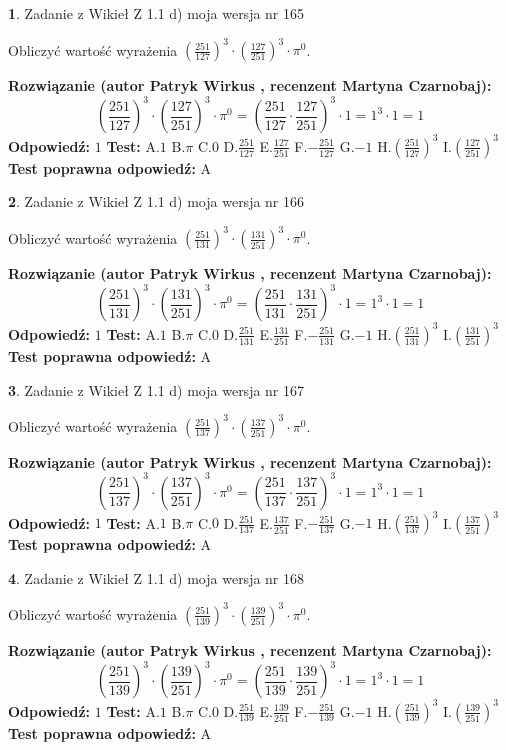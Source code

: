 \documentclass[12pt, a4paper]{article}
\theoremstyle{definition} %
\newtheorem{zad}{}
\newcommand{\zadStart}[1]{\begin{zad}#1\newline}
\newcommand{\zadStop}{\end{zad}}
\newcommand{\rozwStart}[2]{\noindent \textbf{Rozwiązanie (autor #1 , recenzent #2): }\newline}
\newcommand{\rozwStop}{\newline}
\newcommand{\odpStart}{\noindent \textbf{Odpowiedź:}\newline}
\newcommand{\odpStop}{\newline}
\newcommand{\testStart}{\noindent \textbf{Test:}\newline}
\newcommand{\testStop}{\newline}
\newcommand{\kluczStart}{\noindent \textbf{Test poprawna odpowiedź:}\newline}
\newcommand{\kluczStop}{\newline}
\begin{document}
\zadStart{Zadanie z Wikieł Z 1.1 d) moja wersja nr 165}

Obliczyć wartość wyrażenia $(\frac{251}{127})^{3} \cdot (\frac{127}{251})^{3} \cdot \pi^{0}$.
\zadStop
\rozwStart{Patryk Wirkus}{Martyna Czarnobaj}
$$(\frac{251}{127})^{3} \cdot (\frac{127}{251})^{3} \cdot \pi^{0} = (\frac{251}{127} \cdot \frac{127}{251})^{3} \cdot 1 = 1^{3} \cdot 1 = 1$$
\rozwStop
\odpStart
$1$
\odpStop
\testStart
A.$1$ B.$\pi$ C.$0$ D.$\frac{251}{127}$ E.$\frac{127}{251}$
F.$-\frac{251}{127}$ G.$-1$
H.$(\frac{251}{127})^{3}$
I.$(\frac{127}{251})^{3}$
\testStop
\kluczStart
A
\kluczStop



\zadStart{Zadanie z Wikieł Z 1.1 d) moja wersja nr 166}

Obliczyć wartość wyrażenia $(\frac{251}{131})^{3} \cdot (\frac{131}{251})^{3} \cdot \pi^{0}$.
\zadStop
\rozwStart{Patryk Wirkus}{Martyna Czarnobaj}
$$(\frac{251}{131})^{3} \cdot (\frac{131}{251})^{3} \cdot \pi^{0} = (\frac{251}{131} \cdot \frac{131}{251})^{3} \cdot 1 = 1^{3} \cdot 1 = 1$$
\rozwStop
\odpStart
$1$
\odpStop
\testStart
A.$1$ B.$\pi$ C.$0$ D.$\frac{251}{131}$ E.$\frac{131}{251}$
F.$-\frac{251}{131}$ G.$-1$
H.$(\frac{251}{131})^{3}$
I.$(\frac{131}{251})^{3}$
\testStop
\kluczStart
A
\kluczStop



\zadStart{Zadanie z Wikieł Z 1.1 d) moja wersja nr 167}

Obliczyć wartość wyrażenia $(\frac{251}{137})^{3} \cdot (\frac{137}{251})^{3} \cdot \pi^{0}$.
\zadStop
\rozwStart{Patryk Wirkus}{Martyna Czarnobaj}
$$(\frac{251}{137})^{3} \cdot (\frac{137}{251})^{3} \cdot \pi^{0} = (\frac{251}{137} \cdot \frac{137}{251})^{3} \cdot 1 = 1^{3} \cdot 1 = 1$$
\rozwStop
\odpStart
$1$
\odpStop
\testStart
A.$1$ B.$\pi$ C.$0$ D.$\frac{251}{137}$ E.$\frac{137}{251}$
F.$-\frac{251}{137}$ G.$-1$
H.$(\frac{251}{137})^{3}$
I.$(\frac{137}{251})^{3}$
\testStop
\kluczStart
A
\kluczStop



\zadStart{Zadanie z Wikieł Z 1.1 d) moja wersja nr 168}

Obliczyć wartość wyrażenia $(\frac{251}{139})^{3} \cdot (\frac{139}{251})^{3} \cdot \pi^{0}$.
\zadStop
\rozwStart{Patryk Wirkus}{Martyna Czarnobaj}
$$(\frac{251}{139})^{3} \cdot (\frac{139}{251})^{3} \cdot \pi^{0} = (\frac{251}{139} \cdot \frac{139}{251})^{3} \cdot 1 = 1^{3} \cdot 1 = 1$$
\rozwStop
\odpStart
$1$
\odpStop
\testStart
A.$1$ B.$\pi$ C.$0$ D.$\frac{251}{139}$ E.$\frac{139}{251}$
F.$-\frac{251}{139}$ G.$-1$
H.$(\frac{251}{139})^{3}$
I.$(\frac{139}{251})^{3}$
\testStop
\kluczStart
A
\kluczStop
\end{document}
